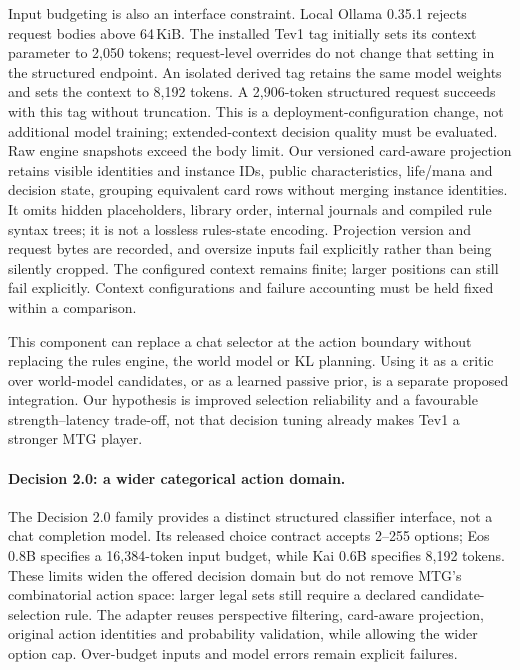 \documentclass[11pt,a4paper]{article}
\theoremstyle{definition}
\theoremstyle{plain}
\begin{document}
Input budgeting is also an interface constraint. Local Ollama 0.35.1
rejects request bodies above 64\,KiB. The installed Tev1 tag initially
sets its context parameter to 2,050 tokens; request-level overrides do
not change that setting in the structured endpoint. An isolated derived
tag retains the same model weights and sets the context to 8,192 tokens.
A 2,906-token structured request succeeds with this tag without truncation.
This is a deployment-configuration change, not additional model training;
extended-context decision quality must be evaluated.
Raw engine snapshots exceed the body limit. Our versioned
card-aware projection retains visible identities and instance IDs,
public characteristics, life/mana and decision state, grouping equivalent
card rows without merging instance identities. It omits hidden placeholders,
library order, internal journals and compiled rule syntax trees; it is
not a lossless rules-state encoding. Projection version and request bytes
are recorded, and oversize inputs fail explicitly rather than being
silently cropped. The configured context remains finite; larger positions
can still fail explicitly. Context configurations and failure accounting
must be held fixed within a comparison.

This component can replace a chat selector at the action boundary without
replacing the rules engine, the world model or KL planning. Using it as a
critic over world-model candidates, or as a learned passive prior, is a
separate proposed integration. Our hypothesis is improved selection
reliability and a favourable strength--latency trade-off, not that
decision tuning already makes Tev1 a stronger MTG player.

\paragraph{Decision 2.0: a wider categorical action domain.}
The Decision 2.0 family \citep{vllmsr2026decision2} provides a distinct
structured classifier interface, not a chat completion model. Its released
choice contract accepts 2--255 options; Eos 0.8B specifies a 16,384-token
input budget, while Kai 0.6B specifies 8,192 tokens. These limits widen the
offered decision domain but do not remove MTG's combinatorial action space:
larger legal sets still require a declared candidate-selection rule.
The adapter reuses perspective filtering, card-aware projection, original
action identities and probability validation, while allowing the wider
option cap. Over-budget inputs and model errors remain explicit failures.
\end{document}
